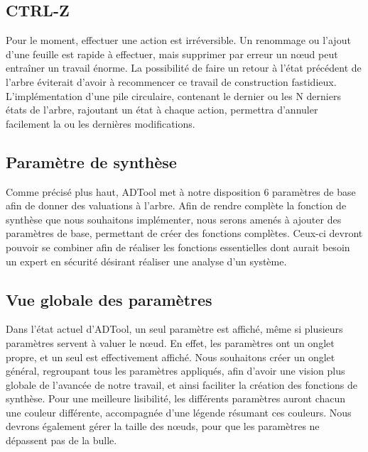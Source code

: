 	\subsection{CTRL-Z}
	Pour le moment, effectuer une action est irréversible. Un renommage ou l'ajout d'une feuille est rapide à effectuer, mais supprimer par erreur un nœud peut entraîner un travail énorme. La possibilité de faire un retour à l'état précédent de l'arbre éviterait d'avoir à recommencer ce travail de construction fastidieux. L'implémentation d'une pile circulaire, contenant le dernier ou les N derniers états de l'arbre, rajoutant un état à chaque action, permettra d'annuler facilement la ou les dernières modifications.
	
	\subsection{Paramètre de synthèse}
	Comme précisé plus haut, ADTool met à notre disposition 6 paramètres de base afin de donner des valuations à l'arbre. Afin de rendre complète la fonction de synthèse que nous souhaitons implémenter, nous serons amenés à ajouter des paramètres de base, permettant de créer des fonctions complètes. Ceux-ci devront pouvoir se combiner afin de réaliser les fonctions essentielles dont aurait besoin un expert en sécurité désirant réaliser une analyse d'un système.
		
	\subsection{Vue globale des paramètres}
	Dans l'état actuel d'ADTool, un seul paramètre est affiché, même si plusieurs paramètres servent à valuer le nœud. En effet, les paramètres ont un onglet propre, et un seul est effectivement affiché. Nous souhaitons créer un onglet général, regroupant tous les paramètres appliqués, afin d'avoir une vision plus globale de l'avancée de notre travail, et ainsi faciliter la création des fonctions de synthèse.
	Pour une meilleure lisibilité, les différents paramètres auront chacun une couleur différente, accompagnée d'une légende résumant ces couleurs.
	Nous devrons également gérer la taille des nœuds, pour que les paramètres ne dépassent pas de la bulle.
